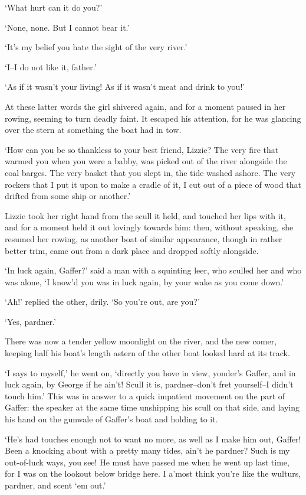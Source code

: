 ‘What hurt can it do you?’

‘None, none. But I cannot bear it.’

‘It’s my belief you hate the sight of the very river.’

‘I--I do not like it, father.’

‘As if it wasn’t your living! As if it wasn’t meat and drink to you!’

At these latter words the girl shivered again, and for a moment paused
in her rowing, seeming to turn deadly faint. It escaped his attention,
for he was glancing over the stern at something the boat had in tow.

‘How can you be so thankless to your best friend, Lizzie? The very
fire that warmed you when you were a babby, was picked out of the river
alongside the coal barges. The very basket that you slept in, the tide
washed ashore. The very rockers that I put it upon to make a cradle
of it, I cut out of a piece of wood that drifted from some ship or
another.’

Lizzie took her right hand from the scull it held, and touched her
lips with it, and for a moment held it out lovingly towards him: then,
without speaking, she resumed her rowing, as another boat of similar
appearance, though in rather better trim, came out from a dark place and
dropped softly alongside.

‘In luck again, Gaffer?’ said a man with a squinting leer, who sculled
her and who was alone, ‘I know’d you was in luck again, by your wake as
you come down.’

‘Ah!’ replied the other, drily. ‘So you’re out, are you?’

‘Yes, pardner.’

There was now a tender yellow moonlight on the river, and the new comer,
keeping half his boat’s length astern of the other boat looked hard at
its track.

‘I says to myself,’ he went on, ‘directly you hove in view, yonder’s
Gaffer, and in luck again, by George if he ain’t! Scull it is,
pardner--don’t fret yourself--I didn’t touch him.’ This was in answer
to a quick impatient movement on the part of Gaffer: the speaker at the
same time unshipping his scull on that side, and laying his hand on the
gunwale of Gaffer’s boat and holding to it.

‘He’s had touches enough not to want no more, as well as I make him
out, Gaffer! Been a knocking about with a pretty many tides, ain’t he
pardner? Such is my out-of-luck ways, you see! He must have passed me
when he went up last time, for I was on the lookout below bridge here. I
a’most think you’re like the wulturs, pardner, and scent ‘em out.’

